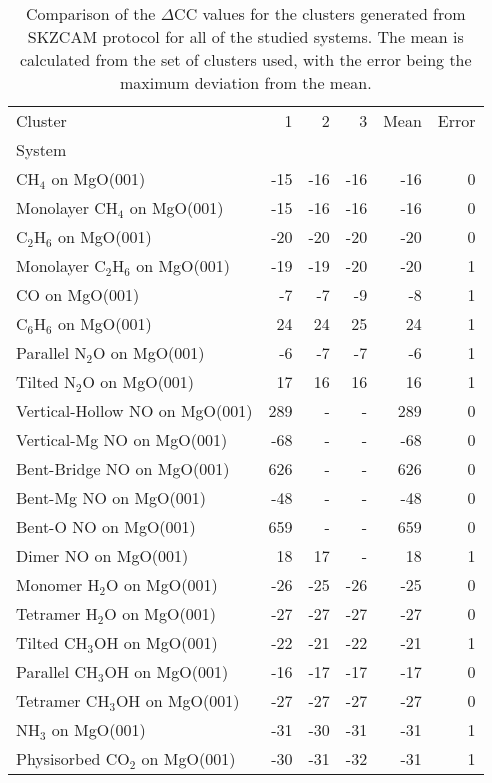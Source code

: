 \begin{table}[h]
\caption{\label{tab:deltacc}Comparison of the $\Delta$CC values for the clusters generated from SKZCAM protocol for all of the studied systems. The mean is calculated from the set of clusters used, with the error being the maximum deviation from the mean.}
\begin{adjustbox}{center,max width=1\textwidth}
\begin{tabular}{lrrrrr}
\toprule
Cluster & 1 & 2 & 3 & Mean & Error \\ 
System &  &  &  &  &  \\
\midrule
CH$_4$ on MgO(001) & -15 & -16 & -16 & -16 & 0 \\
Monolayer CH$_4$ on MgO(001) & -15 & -16 & -16 & -16 & 0 \\
C$_2$H$_6$ on MgO(001) & -20 & -20 & -20 & -20 & 0 \\
Monolayer C$_2$H$_6$ on MgO(001) & -19 & -19 & -20 & -20 & 1 \\
CO on MgO(001) & -7 & -7 & -9 & -8 & 1 \\
C$_6$H$_6$ on MgO(001) & 24 & 24 & 25 & 24 & 1 \\
Parallel N$_2$O on MgO(001) & -6 & -7 & -7 & -6 & 1 \\
Tilted N$_2$O on MgO(001) & 17 & 16 & 16 & 16 & 1 \\
Vertical-Hollow NO on MgO(001) & 289 & - & - & 289 & 0 \\
Vertical-Mg NO on MgO(001) & -68 & - & - & -68 & 0 \\
Bent-Bridge NO on MgO(001) & 626 & - & - & 626 & 0 \\
Bent-Mg NO on MgO(001) & -48 & - & - & -48 & 0 \\
Bent-O NO on MgO(001) & 659 & - & - & 659 & 0 \\
Dimer NO on MgO(001) & 18 & 17 & - & 18 & 1 \\
Monomer H$_2$O on MgO(001) & -26 & -25 & -26 & -25 & 0 \\
Tetramer H$_2$O on MgO(001) & -27 & -27 & -27 & -27 & 0 \\
Tilted CH$_3$OH on MgO(001) & -22 & -21 & -22 & -21 & 1 \\
Parallel CH$_3$OH on MgO(001) & -16 & -17 & -17 & -17 & 0 \\
Tetramer CH$_3$OH on MgO(001) & -27 & -27 & -27 & -27 & 0 \\
NH$_3$ on MgO(001) & -31 & -30 & -31 & -31 & 1 \\
Physisorbed CO$_2$ on MgO(001) & -30 & -31 & -32 & -31 & 1 \\

\end{tabular}
\end{adjustbox}
\end{table}
